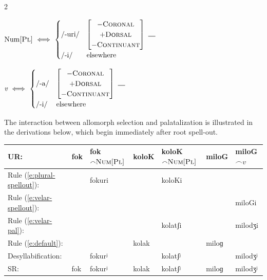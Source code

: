 \documentclass[11pt,letterpaper]{article}
\newcommand{\concat}{\ensuremath{\mathord{\smallfrown}}}
\newcommand{\gap}{\rule{1em}{0.5pt}}
\newcommand{\word}[1]{\textit{#1}}
\newcommand{\feature}[1]{\textsc{#1}}
\newcommand{\featspec}[2]{\ensuremath{#1}\textsc{#2}}
\begin{document}
\begin{multicols}{2}
\begin{unlabeledexample}
$\text{Num}[\feature{Pl}]~\Longleftrightarrow~
\begin{cases}
\textrm{/-uri/} & \begin{bmatrix}
    \featspec{-}{Coronal} \\
    \featspec{+}{Dorsal} \\
    \featspec{-}{Continuant}
\end{bmatrix}~\gap \\[3pt]
\textrm{/-i/} & \textrm{elsewhere}
\end{cases}$
\label{e:plural-spellout}
\end{unlabeledexample}

\begin{unlabeledexample}
$\word{v}~\Longleftrightarrow~
\begin{cases}
\textrm{/-a/} & \begin{bmatrix}
    \featspec{-}{Coronal} \\
    \featspec{+}{Dorsal} \\
    \featspec{-}{Continuant}
\end{bmatrix}~\gap \\[3pt]
\textrm{/-i/} & \textrm{elsewhere}
\end{cases}$
\label{e:velar-spellout}
\end{unlabeledexample}
\end{multicols}

\noindent
The interaction between allomorph selection and palatalization is illustrated in the derivations below,
which begin immediately after root spell-out.

\begin{unlabeledexample}
\begin{tabular}{l llllll}
UR: & fok & fok$\concat\feature{Num}[\feature{Pl}]$
    & koloK & koloK$\concat\feature{Num}[\feature{Pl}]$
    & miloG & miloG$\concat v$ \\
\midrule
Rule (\ref{e:plural-spellout}): &     & fokuri &       & koloKi  &       &         \\
Rule (\ref{e:velar-spellout}):  &     &        &       &         &       & miloGi  \\
Rule (\ref{e:velar-pal}):       &     &        &       & kolatʃi &       & milodʒi \\
Rule (\ref{e:default}):         &     &        & kolak &         & miloɡ &         \\
Desyllabification:              &     & fokurʲ &       & kolatʃʲ &       & milodʒʲ \\
\midrule
SR: & fok & fokurʲ & kolak & kolatʃʲ & miloɡ & milodʒʲ \\
\end{tabular}
\label{e:derivation}
\end{unlabeledexample}
\end{document}
